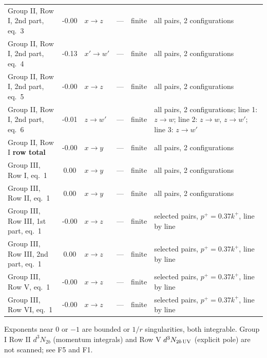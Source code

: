 \documentclass[10pt]{article}
\begin{document}
{\begin{longtable}{p{5.2cm}cp{1.6cm}p{2.4cm}p{1.4cm}p{4.2cm}}
Group II, Row I, 2nd part, eq.~3 & -0.00 & $x\to z$ & --- & finite & {\footnotesize all pairs, 2 configurations}\\
Group II, Row I, 2nd part, eq.~4 & -0.13 & $x'\to w'$ & --- & finite & {\footnotesize all pairs, 2 configurations}\\
Group II, Row I, 2nd part, eq.~5 & -0.00 & $x\to z$ & --- & finite & {\footnotesize all pairs, 2 configurations}\\
Group II, Row I, 2nd part, eq.~6 & -0.01 & $z\to w'$ & --- & finite & {\footnotesize all pairs, 2 configurations; line 1: $z\to w$; line 2: $z\to w$, $z\to w'$; line 3: $z\to w'$}\\
Group II, Row I \textbf{row total} & -0.00 & $x\to y$ & --- & finite & {\footnotesize all pairs, 2 configurations}\\
Group III, Row I, eq.~1 & 0.00 & $x\to y$ & --- & finite & {\footnotesize all pairs, 2 configurations}\\
Group III, Row II, eq.~1 & 0.00 & $x\to y$ & --- & finite & {\footnotesize all pairs, 2 configurations}\\
Group III, Row III, 1st part, eq.~1 & -0.00 & $x\to z$ & --- & finite & {\footnotesize selected pairs, $p^+=0.37k^+$, line by line}\\
Group III, Row III, 2nd part, eq.~1 & 0.00 & $x\to z$ & --- & finite & {\footnotesize selected pairs, $p^+=0.37k^+$, line by line}\\
Group III, Row V, eq.~1 & -0.00 & $x\to z$ & --- & finite & {\footnotesize selected pairs, $p^+=0.37k^+$, line by line}\\
Group III, Row VI, eq.~1 & -0.00 & $x\to z$ & --- & finite & {\footnotesize selected pairs, $p^+=0.37k^+$, line by line}\\
\bottomrule
\end{longtable}}
Exponents near $0$ or $-1$ are bounded or $1/r$ singularities, both integrable. Group I Row II $d^3N_{2b}$ (momentum integrals) and Row V $d^3N_{2b\,\rm UV}$ (explicit pole) are not scanned; see F5 and F1.
\end{document}
